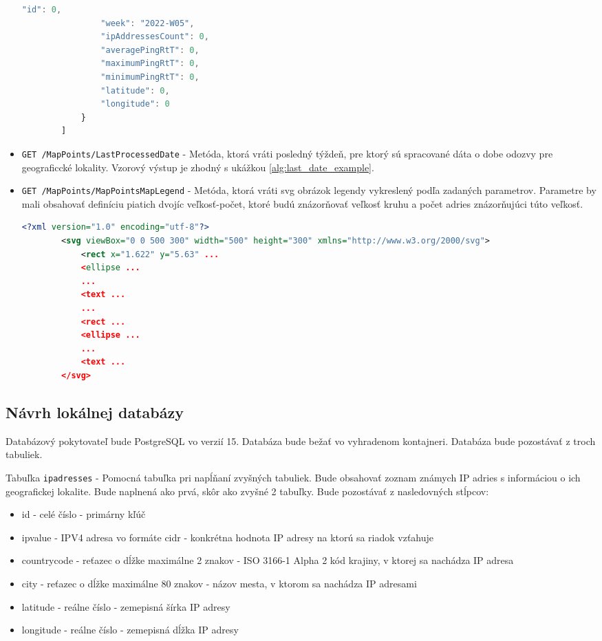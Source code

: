 \begin{itemize}
\begin{lstlisting}[language={TypeScript},caption={Vzorový výstup z endpointu},label=alg:get_map_points_info_example]
                "id": 0,
                "week": "2022-W05",
                "ipAddressesCount": 0,
                "averagePingRtT": 0,
                "maximumPingRtT": 0,
                "minimumPingRtT": 0,
                "latitude": 0,
                "longitude": 0
            }
        ]
    \end{lstlisting}
    \item \verb|GET /MapPoints/LastProcessedDate| - Metóda, ktorá vráti posledný týždeň, pre ktorý sú spracované dáta o dobe odozvy pre geograficcké lokality.
    Vzorový výstup je zhodný s ukážkou \ref{alg:last_date_example}.
    \item \verb|GET /MapPoints/MapPointsMapLegend| - Metóda, ktorá vráti svg obrázok legendy vykreslený podľa zadaných parametrov. Parametre by mali obsahovať 
    definíciu piatich dvojíc veľkosť-počet, ktoré budú znázorňovať veľkosť kruhu a počet adries znázorňujúci túto veľkosť.
    \begin{lstlisting}[language={XML},caption={Vzorový výstup z endpointu},label=alg:legend_example]
        <?xml version="1.0" encoding="utf-8"?>
        <svg viewBox="0 0 500 300" width="500" height="300" xmlns="http://www.w3.org/2000/svg">
            <rect x="1.622" y="5.63" ...
            <ellipse ...
            ...
            <text ...
            ...
            <rect ...
            <ellipse ...
            ...
            <text ...
        </svg>
    \end{lstlisting}
\end{itemize}

\subsection{Návrh lokálnej databázy}
Databázový pokytovateľ bude PostgreSQL vo verzií 15. Databáza bude bežať vo vyhradenom kontajneri. Databáza bude pozostávať z troch tabuliek. 
    
Tabuľka \lstinline{ipadresses} - Pomocná tabuľka pri napĺňaní zvyšných tabuliek. Bude obsahovať zoznam známych IP adries s informáciou 
o ich geografickej lokalite. Bude naplnená ako prvá, skôr ako zvyšné 2 tabuľky. Bude pozostávať z nasledovných stĺpcov:
\begin{itemize}
    \item id - celé číslo - primárny kľúč
    \item ipvalue - IPV4 adresa vo formáte cidr - konkrétna hodnota IP adresy na ktorú sa riadok vzťahuje
    \item countrycode - reťazec o dĺžke maximálne 2 znakov - ISO 3166-1 Alpha 2 kód krajiny, v ktorej sa nachádza IP adresa
    \item city - reťazec o dĺžke maximálne 80 znakov - názov mesta, v ktorom sa nachádza IP adresami
    \item latitude - reálne číslo - zemepisná šírka IP adresy
    \item longitude - reálne číslo - zemepisná dĺžka IP adresy
\end{itemize}

